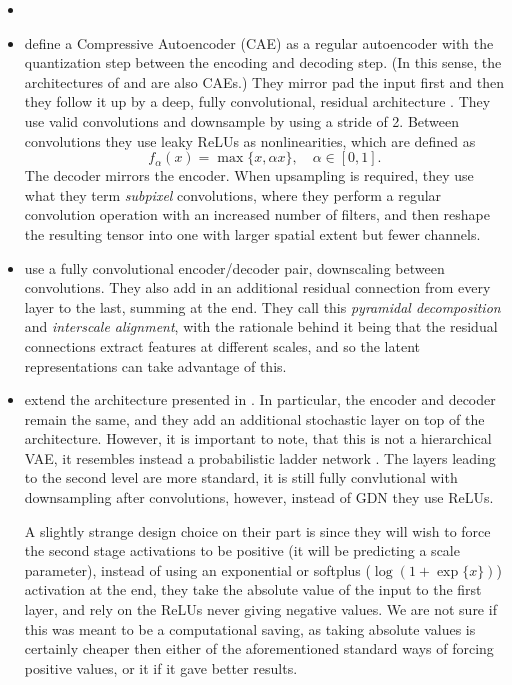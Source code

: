 \documentclass{article}
\begin{document}
\begin{itemize}
\item \cite{toderici2017full}
\item \cite{theis2017lossy} define a Compressive Autoencoder (CAE) as a regular
  autoencoder with the quantization step between the encoding and decoding step.
  (In this sense, the architectures of \cite{balle2016end} and
  \cite{balle2018variational} are also CAEs.) They mirror pad the input first
  and then they follow it up by a deep, fully convolutional, residual
  architecture \cite{he2016deep}. They use valid convolutions and downsample by
  using a stride of 2. Between convolutions they use leaky ReLUs as
  nonlinearities, which are defined as 
  \[
    f_\alpha(x) = \max\{x, \alpha x\}, \quad \alpha \in [0, 1].
  \]
  The decoder mirrors the encoder. When upsampling is required, they use what
  they term \textit{subpixel} convolutions, where they perform a regular
  convolution operation with an increased number of filters, and then reshape
  the resulting tensor into one with larger spatial extent but fewer channels.
\item \cite{rippel2017real} use a fully convolutional encoder/decoder pair,
  downscaling between convolutions. They also add in an additional residual
  connection from every layer to the last, summing at the end. They call this
  \textit{pyramidal decomposition} and \textit{interscale alignment}, with the
  rationale behind it being that the residual connections extract features at
  different scales, and so the latent representations can take advantage of this.
\item \cite{balle2018variational} extend the architecture presented in
  \cite{balle2016end}. In particular, the encoder and decoder remain the same,
  and they add an additional stochastic layer on top of the architecture.
  However, it is important to note, that this is not a hierarchical VAE, it
  resembles instead a probabilistic ladder network \cite{sonderby2016train}.
  The layers leading to the second level are more standard, it is still fully
  convlutional with downsampling after convolutions, however, instead of GDN
  they use ReLUs.
  \par
  A slightly strange
  design choice on their part is since they will wish to force the second stage
  activations to be positive (it will be predicting a scale parameter), instead
  of using an exponential or softplus ($\log (1 + \exp\{x\})$) activation at the
  end, they take the absolute value of the input to the first layer, and rely on
  the ReLUs never giving negative values. We are not sure if this was meant to
  be a computational saving, as taking absolute values is certainly cheaper then
  either of the aforementioned standard ways of forcing positive values, or it
  if it gave better results.
\end{itemize}
\end{document}
